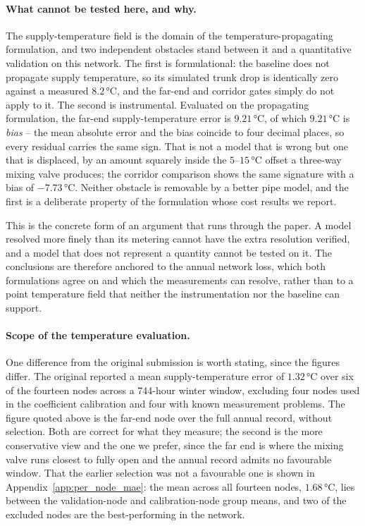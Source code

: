 \paragraph{What cannot be tested here, and why.}
The supply-temperature field is the domain of the temperature-propagating formulation, and
two independent obstacles stand between it and a quantitative validation on this network.
The first is formulational: the baseline does not propagate supply temperature, so its
simulated trunk drop is identically zero against a measured $8.2$\,°C, and the far-end and
corridor gates simply do not apply to it. The second is instrumental. Evaluated on the
propagating formulation, the far-end supply-temperature error is $9.21$\,°C, of which
$9.21$\,°C is \emph{bias} -- the mean absolute error and the bias coincide to four decimal
places, so every residual carries the same sign. That is not a model that is wrong but one
that is displaced, by an amount squarely inside the $5$--$15$\,°C offset a three-way mixing
valve produces; the corridor comparison shows the same signature with a bias of
$-7.73$\,°C. Neither obstacle is removable by a better pipe model, and the first is a
deliberate property of the formulation whose cost results we report.

This is the concrete form of an argument that runs through the paper. A model resolved more
finely than its metering cannot have the extra resolution verified, and a model that does
not represent a quantity cannot be tested on it. The conclusions are therefore anchored to
the annual network loss, which both formulations agree on and which the measurements can
resolve, rather than to a point temperature field that neither the instrumentation nor the
baseline can support.

\paragraph{Scope of the temperature evaluation.}
One difference from the original submission is worth stating, since the figures differ. The
original reported a mean supply-temperature error of $1.32$\,°C over six of the fourteen
nodes across a 744-hour winter window, excluding four nodes used in the coefficient
calibration and four with known measurement problems. The figure quoted above is the far-end
node over the full annual record, without selection. Both are correct for what they measure;
the second is the more conservative view and the one we prefer, since the far end is where
the mixing valve runs closest to fully open and the annual record admits no favourable
window. That the earlier selection was not a favourable one is shown in
Appendix~\ref{app:per_node_mae}: the mean across all fourteen nodes, $1.68$\,°C, lies
between the validation-node and calibration-node group means, and two of the excluded nodes
are the best-performing in the network.

